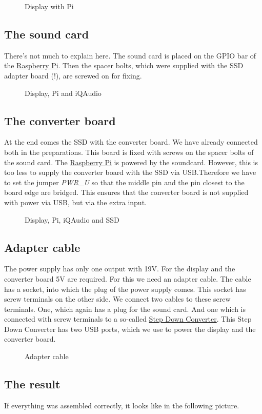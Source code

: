 \documentclass[12pt,a4paper]{article}
\newcommand{\jpaimg}[2]{\begin{figure}[H]\centering\fbox{\texttt{[image: \#1]}}\caption{#2}\label{fig:#2}\end{figure}}
\newcommand{\rpi}{\href{https://www.raspberrypi.org/}{Raspberry Pi}\index{Raspberry Pi}}
\begin{document}
\jpaimg{./../images/dsp-pi.png}{Display with Pi}

\subsection{The sound card}
There's not much to explain here. The sound card is placed on the GPIO bar of the \rpi{}. Then the spacer bolts, which were supplied with the SSD adapter
board (!), are screwed on for fixing.

\jpaimg{./../images/dsp-pi-iq.png}{Display, Pi and iQAudio}

\subsection{The converter board}
At the end comes the SSD with the converter board. We have already connected both in the preparations. This board is fixed with screws on the spacer bolts of
the sound card. The \rpi{} is powered by the soundcard. However, this is too less to supply the converter board with the SSD via USB.\@ Therefore we have to set
the jumper \textit{PWR\_U} so that the middle pin and the pin closest to the board edge are bridged. This ensures that the converter board is not supplied with
power via USB, but via the extra input.

\jpaimg{./../images/dsp-pi-iq-ssd.png}{Display, Pi, iQAudio and SSD}

\subsection{Adapter cable}
The power supply has only one output with 19V. For the display and the converter board 5V are required. For this we need an adapter cable. The cable has a
socket, into which the plug of the power supply comes. This socket has screw terminals on the other side. We connect two cables to these screw terminals. One,
which again has a plug for the sound card. And one which is connected with screw terminals to a so-called
\href{https://en.wikipedia.org/wiki/Buck_converter}{Step Down Converter}. This Step Down Converter has two USB ports, which we use to power the display
and the converter board.

\jpaimg{./../images/adaptercable.png}{Adapter cable}

\subsection{The result}
If everything was assembled correctly, it looks like in the following picture.
\end{document}
